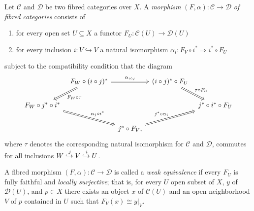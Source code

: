 \begin{definition}\label{def:morphisms-fibred-categories}
	Let $\mathcal{C}$ and $\mathcal{D}$ be two fibred categories over $X$. A \textit{morphism} $ (F, \alpha)\colon \mathcal{C} \to \mathcal{D}$ \textit{of fibred categories} consists of
	\begin{enumerate}[label = (\roman*)]
		\item for every open set $U \subseteq X$ a functor $ F_{U}\colon \mathcal{C}(U) \to \mathcal{D}(U)$ 
		\item for every inclusion $i\colon V \hookrightarrow V$ a natural isomorphism $\alpha_{i}\colon  F_{V} \circ i^{*} \Rightarrow i^{*} \circ  F_{U}$ 
	\end{enumerate}
	subject to the compatibility condition that the diagram
		\begin{equation}\label{eqn:morphisms-fibred-categories-compatibility}
		\begin{tikzcd}[column sep = tiny]
                                                        &  F_{W}\circ (i\circ j)^{*} \arrow[ld, Rightarrow, " F_{W}\circ \tau"] \arrow[rr, Rightarrow, "\alpha_{i\circ j}"] &                                            & (i \circ j)^{*} \circ  F_{U} \arrow[rd, Rightarrow, "\tau \circ  F_U"] &                                 \\
 F_{W}\circ j^{*} \circ i^{*} \arrow[rrd, Rightarrow, "\alpha_{j}\circ i^{*}"] &                                                                            &                                            &                                                       & j^{*}\circ i^{*} \circ  F_{U} \\
                                                        &                                                                            & j^{*}\circ F_{V}, \arrow[rru, Rightarrow, "j^{*}\circ \alpha_{i}"] &                                                       &                                
		\end{tikzcd}
		\end{equation}
		where $\tau$ denotes the corresponding natural isomorphism for $\mathcal{C}$ and $\mathcal{D}$, commutes for all inclusions $W \xhookrightarrow{j} V \xhookrightarrow{i} U$. 	
\end{definition}
\begin{definition}\label{def:weak-equivalence}
	A fibred morphism $(F, \alpha)\colon \mathcal{C} \to \mathcal{D}$ is called a \textit{weak equivalence} if every $F_{U}$ is fully faithful and \emph{locally surjective}; that is, for every $U$ open subset of $X$, $y$ of $\mathcal{D}(U)$, and $p \in X$ there exists an object $x$ of $\mathcal{C}(U)$ and an open neighborhood $V$ of $p$ contained in $U$ such that $F_{V}(x) \cong y\lvert_{V}$.
\end{definition}
